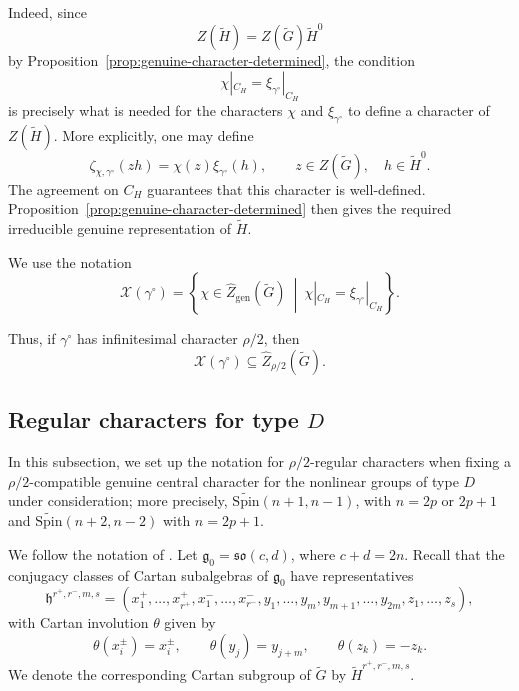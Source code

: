 \documentclass{amsart}
\newcommand{\Spin}{{\mathrm{Spin}}}
\theoremstyle{definition}
\newcommand{\tu}{\widetilde}
\begin{document}
Indeed, since
\[
Z(\tu H)=Z(\tu G)\tu H^0
\]
by Proposition~\ref{prop:genuine-character-determined}, the condition
\[
\chi|_{C_H}
=
\xi_{\gamma^\circ}|_{C_H}
\]
is precisely what is needed for the characters \(\chi\) and
\(\xi_{\gamma^\circ}\) to define a character of \(Z(\tu H)\).  More
explicitly, one may define
\[
\zeta_{\chi,\gamma^\circ}(zh)
=
\chi(z)\xi_{\gamma^\circ}(h),
\qquad
z\in Z(\tu G),\quad h\in\tu H^0.
\]
The agreement on \(C_H\) guarantees that this character is
well-defined.  Proposition~\ref{prop:genuine-character-determined}
then gives the required irreducible genuine representation of
\(\tu H\).

We use the notation
\begin{equation} \label{e:bigchi}
\mathcal X(\gamma^\circ)
=
\left\{
\chi\in\widehat Z_{\mathrm{gen}}(\tu G)
\ \middle|\
\chi|_{C_H}
=
\xi_{\gamma^\circ}|_{C_H}
\right\}.
\end{equation}

Thus, if \(\gamma^\circ\) has infinitesimal character \(\rho/2\), then
\[
\mathcal X(\gamma^\circ)
\subseteq
\widehat Z_{\rho/2}(\tu G).
\]



\subsection{Regular characters for type $D$} \label{s:parameters}

In this subsection, we set up the notation for $\rho/2$-regular characters when fixing a $\rho/2$-compatible genuine central character for the nonlinear groups of type $D$ under consideration; more precisely, $\widetilde{\Spin}(n+1, n-1)$, with $n=2p$ or $2p+1$  and $\widetilde{\Spin}(n+2,n-2)$ with $n=2p+1$. 

We follow the notation of \cite[Section 6]{BTs18}. Let $\mathfrak g_0=\mathfrak{so}(c,d)$, where $c+d=2n$. Recall that the conjugacy classes of Cartan subalgebras of $\mathfrak g_0$ have representatives
\begin{equation*}
\mathfrak h^{r^+,r^-,m,s}
=
{(x_1^+,\ldots,x_{r^+}^+,
x_1^-,\ldots,x_{r^-}^-,
y_1,\ldots,y_m,y_{m+1},\ldots,y_{2m},
z_1,\ldots,z_s)},
\end{equation*}
with Cartan involution $\theta$ given by
\begin{equation*}
\theta(x_i^\pm)=x_i^\pm,\qquad
\theta(y_j)=y_{j+m},\qquad
\theta(z_k)=-z_k.
\end{equation*}
We denote the corresponding Cartan subgroup of $\widetilde G$ by $\widetilde H^{r^+,r^-,m,s}$.
\end{document}
